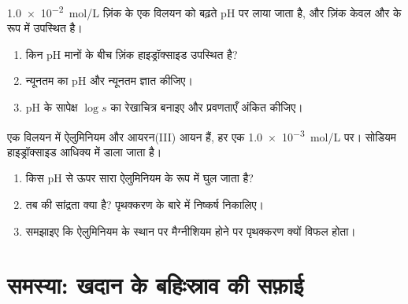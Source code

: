 \begin{exercise}[$\star\star\star$]\label{exo:b1:precipitation:11}
\qty{1.0e-2}{mol/L} ज़िंक के एक विलयन को बढ़ते pH पर लाया जाता है,
और ज़िंक केवल  और  के रूप में उपस्थित है।
\begin{enumerate}
  \item किन pH मानों के बीच ज़िंक हाइड्रॉक्साइड उपस्थित है?
  \item न्यूनतम  का pH और न्यूनतम  ज्ञात कीजिए।
  \item pH के सापेक्ष $\log s$ का रेखाचित्र बनाइए और प्रवणताएँ अंकित कीजिए।
\end{enumerate}
\end{exercise}

\begin{exercise}[$\star\star\star$]\label{exo:b1:precipitation:12}
एक विलयन में ऐलुमिनियम और आयरन(III) आयन हैं, हर एक
\qty{1.0e-3}{mol/L} पर। सोडियम हाइड्रॉक्साइड आधिक्य में डाला जाता है।
\begin{enumerate}
  \item किस pH से ऊपर सारा ऐलुमिनियम  के रूप में घुल जाता है?
  \item तब  की सांद्रता क्या है? पृथक्करण के बारे में
        निष्कर्ष निकालिए।
  \item समझाइए कि ऐलुमिनियम के स्थान पर मैग्नीशियम होने पर पृथक्करण क्यों
        विफल होता।
\end{enumerate}
\end{exercise}

\section{समस्या: खदान के बहिःस्राव की सफ़ाई}

